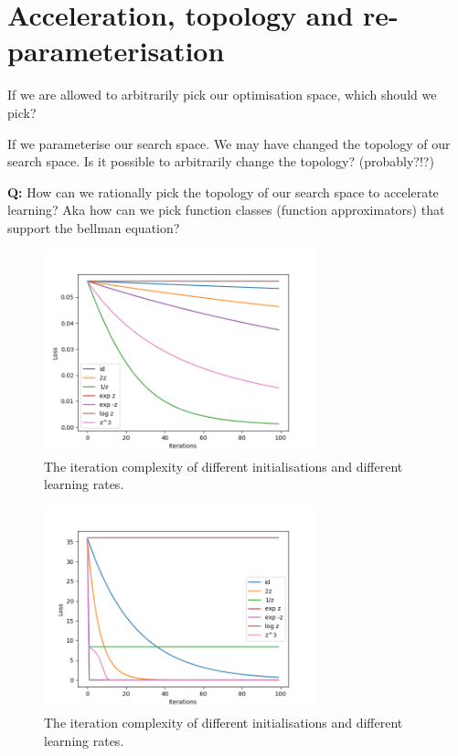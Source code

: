 \section{Acceleration, topology and re-parameterisation}

If we are allowed to arbitrarily pick our optimisation space, which should we pick?

If we parameterise our search space. We may have changed the topology of our search space.
Is it possible to arbitrarily change the topology? (probably?!?)

\textbf{Q:} How can we rationally pick the topology of our search space
to accelerate learning?
Aka how can we pick function classes (function approximators) that support the bellman equation?

\begin{figure}
\centering
\includegraphics[width=0.7\textwidth,height=0.35\textheight]{../../pictures/figures/reparam-ce-04.png}
\caption{The iteration complexity of different initialisations and different learning rates.}
\end{figure}

\begin{figure}
\centering
\includegraphics[width=0.7\textwidth,height=0.35\textheight]{../../pictures/figures/reparam-mse-04.png}
\caption{The iteration complexity of different initialisations and different learning rates.}
\end{figure}

